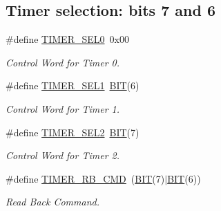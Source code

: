 \subsection*{Timer selection\+: bits 7 and 6}
\begin{DoxyCompactItemize}
\item 
\#define \hyperlink{group__i8254_ga6a4822642d40c248435692324a818010}{T\+I\+M\+E\+R\+\_\+\+S\+E\+L0}~0x00
\begin{DoxyCompactList}\small\item\em Control Word for Timer 0. \end{DoxyCompactList}\item 
\#define \hyperlink{group__i8254_ga8349623fd8d99f9cc5d8ae29d78594fc}{T\+I\+M\+E\+R\+\_\+\+S\+E\+L1}~\hyperlink{video__gr_8c_a3a8ea58898cb58fc96013383d39f482c}{B\+IT}(6)
\begin{DoxyCompactList}\small\item\em Control Word for Timer 1. \end{DoxyCompactList}\item 
\#define \hyperlink{group__i8254_ga142a255de0dbc48aeabd45fc10c33672}{T\+I\+M\+E\+R\+\_\+\+S\+E\+L2}~\hyperlink{video__gr_8c_a3a8ea58898cb58fc96013383d39f482c}{B\+IT}(7)
\begin{DoxyCompactList}\small\item\em Control Word for Timer 2. \end{DoxyCompactList}\item 
\#define \hyperlink{group__i8254_ga4c2eecbfb96744a9c2af71dba75ecb18}{T\+I\+M\+E\+R\+\_\+\+R\+B\+\_\+\+C\+MD}~(\hyperlink{video__gr_8c_a3a8ea58898cb58fc96013383d39f482c}{B\+IT}(7)$\vert$\hyperlink{video__gr_8c_a3a8ea58898cb58fc96013383d39f482c}{B\+IT}(6))
\begin{DoxyCompactList}\small\item\em Read Back Command. \end{DoxyCompactList}\end{DoxyCompactItemize}

